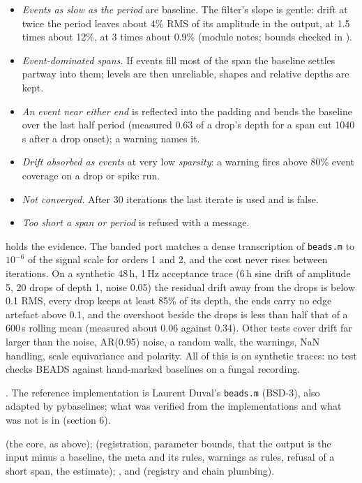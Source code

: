 \begin{itemize}
\item \emph{Events as slow as the period} are baseline. The filter's slope is gentle: drift
  at twice the period leaves about 4\% RMS of its amplitude in the output, at 1.5 times about
  12\%, at 3 times about 0.9\% (module notes; bounds checked in
  ).
\item \emph{Event-dominated spans.} If events fill most of the span the baseline settles partway
  into them; levels are then unreliable, shapes and relative depths are kept.
\item \emph{An event near either end} is reflected into the padding and bends the baseline over
  the last half period (measured 0.63 of a drop's depth for a span cut 1040\,s after a drop
  onset); a warning names it.
\item \emph{Drift absorbed as events} at very low \emph{sparsity}: a warning fires above 80\%
  event coverage on a drop or spike run.
\item \emph{Not converged.} After 30 iterations the last iterate is used and
   is false.
\item \emph{Too short a span or period} is refused with a message.
\end{itemize}

 holds the evidence. The banded port matches a dense transcription of
\texttt{beads.m} to $10^{-6}$ of the signal scale for orders 1 and 2, and the cost never rises
between iterations. On a synthetic 48\,h, 1\,Hz acceptance trace (6\,h sine drift of amplitude
5, 20 drops of depth 1, noise 0.05) the residual drift away from the drops is below 0.1 RMS,
every drop keeps at least 85\% of its depth, the ends carry no edge artefact above 0.1, and the
overshoot beside the drops is less than half that of a 600\,s rolling mean (measured about
0.06 against 0.34). Other tests cover drift far larger than the noise, AR(0.95) noise, a random
walk, the warnings, NaN handling, scale equivariance and polarity. All of this is on synthetic
traces: no test checks BEADS against hand-marked baselines on a fungal recording.

\citet{ning2014chromatogram}. The reference implementation is Laurent Duval's
\texttt{beads.m} (BSD-3), also adapted by pybaselines; what was verified from the
implementations and what was not is in 
(section 6).

 (the core, as above); 
(registration, parameter bounds, that the output is the input minus a baseline, the meta and its
rules, warnings as rules, refusal of a short span, the estimate);
,  and
 (registry and chain plumbing).
